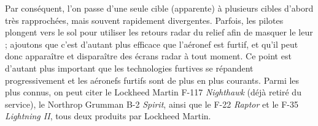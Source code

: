 	
	Par conséquent, l'on passe d'une seule cible (apparente) à plusieurs cibles d'abord très rapprochées, mais souvent rapidement divergentes. Parfois, les pilotes plongent vers le sol pour utiliser les retours radar du relief afin de masquer le leur ; ajoutons que c'est d'autant plus efficace que l'aéronef est furtif, et qu'il peut donc apparaître et disparaître des écrans radar à tout moment. Ce point est d'autant plus important que les technologies furtives se répandent progressivement et les aéronefs furtifs sont de plus en plus courants. Parmi les plus connus, on peut citer le Lockheed Martin F-117 \emph{Nighthawk} (déjà retiré du service), le Northrop Grumman B-2 \emph{Spirit}, ainsi que le F-22 \emph{Raptor} et le F-35 \emph{Lightning II}, tous deux produits par Lockheed Martin.
	
